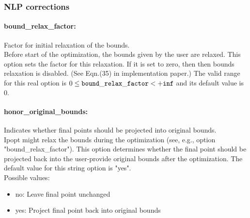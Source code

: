 \subsubsection{NLP corrections}

\paragraph{bound\_relax\_factor:} Factor for initial relaxation of the bounds. $\;$ \\
 Before start of the optimization, the bounds
given by the user are relaxed.  This option sets
the factor for this relaxation.  If it is set to
zero, then then bounds relaxation is disabled.
(See Eqn.(35) in implementation paper.) The valid range for this real option is 
$0 \le {\tt bound\_relax\_factor } <  {\tt +inf}$
and its default value is $0$.


\paragraph{honor\_original\_bounds:} Indicates whether final points should be projected into original bounds. $\;$ \\
 Ipopt might relax the bounds during the
optimization (see, e.g., option
"bound\_relax\_factor").  This option determines
whether the final point should be projected back
into the user-provide original bounds after the
optimization.
The default value for this string option is "yes".
\\ 
Possible values:
\begin{itemize}
   \item no: Leave final point unchanged
   \item yes: Project final point back into original bounds
\end{itemize}


